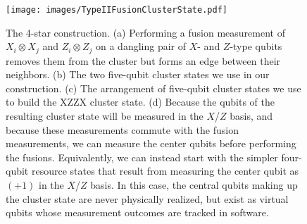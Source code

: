 \documentclass[reprint,
groupedaddress,
 prl,amsmath,amssymb,
 aps]{revtex4-2}
\theoremstyle{definition}
\begin{document}
\begin{bibunit}
\begin{figure}
    \centering
    \texttt{[image: images/TypeIIFusionClusterState.pdf]}
    \caption{The 4-star construction. (a) Performing a fusion measurement of $X_i\otimes X_j$ and $Z_i\otimes  Z_j$ on a dangling pair of $X$- and $Z$-type qubits removes them from the cluster but forms an edge between their neighbors. (b) The two five-qubit cluster states we use in our construction. (c) The arrangement of five-qubit cluster states we use to build the XZZX cluster state. (d) Because the qubits of the resulting cluster state will be measured in the $X$/$Z$ basis, and because these measurements commute with the fusion measurements, we can measure the center qubits before performing the fusions. Equivalently, we can instead start with the simpler four-qubit resource states that result from measuring the center qubit as $(+1)$ in the $X$/$Z$ basis. In this case, the central qubits making up the cluster state are never physically realized, but exist as virtual qubits whose measurement outcomes are tracked in software.}
    \label{fig:TypeIIFusionClusterState}
\end{figure}


\end{bibunit}
\end{document}
